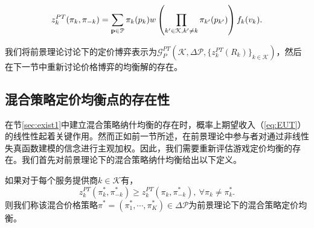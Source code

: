 \begin{equation}\label{eq:PT}
z_{k}^{PT}(\pi_{k},\pi_{-k})=\sum_{\mathbf{p}\in \mathcal{P}}\pi_k(p_k)w\left(\prod_{k'\in\mathcal{K},k'\neq k}\pi_{k'}(p_{k'})\right)f_k(v_k).
\end{equation}

我们将前景理论讨论下的定价博弈表示为$\mathcal{G}_P^{PT}\left(\mathcal{K},\Delta\mathcal{P},\{z_k^{PT}(R_k)\}_{k\in\mathcal{K}}\right)$，然后在下一节中重新讨论价格博弈的均衡解的存在。


\subsection{混合策略定价均衡点的存在性}
在节\ref{sec:exist1}中建立混合策略纳什均衡的存在时，概率上期望收入（\ref{eq:EUT}）的线性性起着关键作用。然而正如前一节所述，在前景理论中参与者对通过非线性失真函数建模的信念进行主观加权。因此，我们需要重新评估游戏定价均衡的存在。我们首先对前景理论下的混合策略纳什均衡给出以下定义。

\begin{df}
如果对于每个服务提供商$k\in\mathcal{K}$有，
\begin{equation}
z_{k}^{PT}(\pi_{k}^*,\pi_{-k}^*)\geq z_{k}^{PT}(\pi_{k},\pi_{-k}^*),~\forall \pi_k\ne\pi_k^*.
\end{equation}
则我们称该混合价格策略$\pi^*=(\pi_{1}^*,\cdots,\pi_{K}^*)\in\Delta\mathcal{P}$为前景理论下的混合策略定价均衡。
\end{df}

